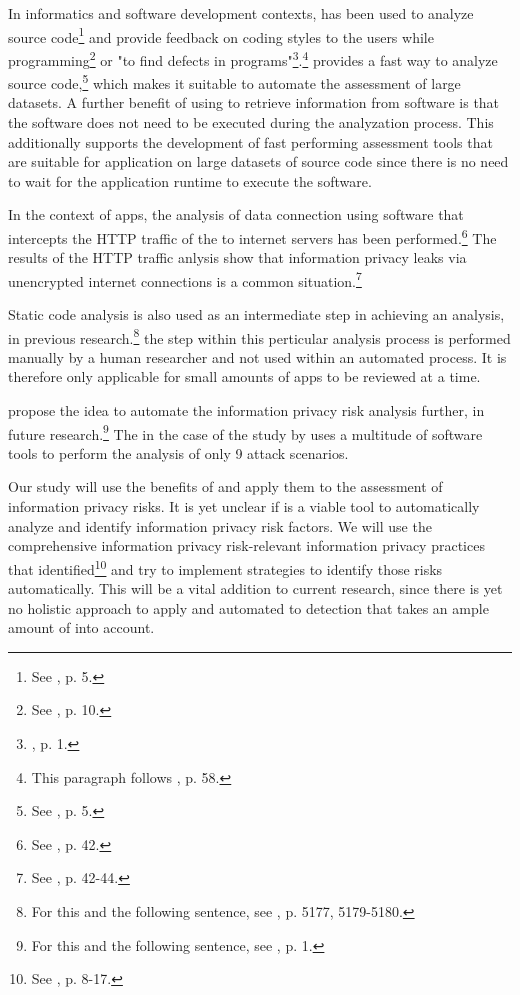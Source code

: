 In informatics and software development contexts, \sca has been used to analyze source code\footnote{See \cite{Haris2014}, p.  5.} and provide feedback on coding styles to the users while programming\footnote{See \cite{Bardas2010}, p. 10.} or "to find defects in programs"\footnote{\cite{Bardas2010}, p. 1.}.\footnote{This paragraph follows \cite{Louridas2006}, p. 58.}
\Sca provides a fast way to analyze source code,\footnote{See \cite{Bardas2010}, p. 5.} which makes it suitable to automate the assessment of large datasets.
A further benefit of using \sca to retrieve information from software is that the software does not need to be executed during the analyzation process.
This additionally supports the development of fast performing assessment tools that are suitable for application on large datasets of source code since there is no need to wait for the application runtime to execute the software.

In the context of \mH apps, the analysis of data connection using software that intercepts the HTTP traffic of the \mH to internet servers has been performed.\footnote{See \cite{Mense2015}, p. 42.}
The results of the HTTP traffic anlysis show that information privacy leaks via unencrypted internet connections is a common situation.\footnote{See \cite{Mense2015}, p. 42-44.}

Static code analysis is also used as an intermediate step in achieving an \ipr analysis, in previous research.\footnote{For this and the following sentence, see \cite{Dorazio2015}, p. 5177, 5179-5180.}
the \sca step within this perticular analysis process is performed manually by a human researcher and not used within an automated process.
It is therefore only applicable for small amounts of apps to be reviewed at a time.

\textcite{Knorr2015} propose the idea to automate the information privacy risk analysis further, in future research.\footnote{For this and the following sentence, see \cite{Knorr2015}, p. 1.}
The \sca in the case of the study by \textcite{Knorr2015} uses a multitude of software tools to perform the analysis of only 9 attack scenarios.

Our study will use the benefits of \sca and apply them to the assessment of \mH information privacy risks.
It is yet unclear if \sca is a viable tool to automatically analyze and identify information privacy risk factors.
We will use the comprehensive information privacy risk-relevant information privacy practices that \cite{Dehling2016} identified\footnote{See \cite{Dehling2016}, p. 8-17.} and try to implement \sca strategies to identify those risks automatically.
This will be a vital addition to current research, since there is yet no holistic approach to apply and automated \sca to \ipr detection that takes an ample amount of \iprfs into account.

